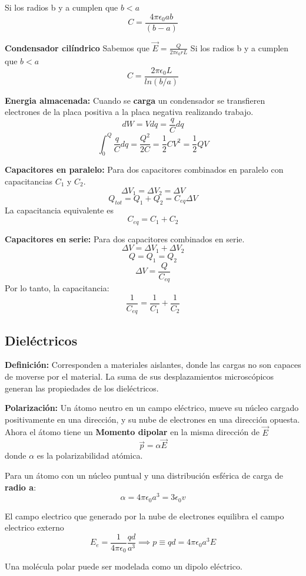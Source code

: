 \documentclass[a4paper, 10pt]{article}
\begin{document}
\begin{multicols*}{2}
	Si los radios b y a cumplen que $b<a$
	$$C = \frac{4 \pi \epsilon_0 ab}{(b-a)}$$
	    
	\textbf{Condensador cilíndrico}
	Sabemos que $\vec{E} = \frac{Q}{2 \pi \epsilon_0 r L}$
	Si los radios b y a cumplen que $b<a$
	$$C = \frac{2 \pi \epsilon_0 L}{ln(b/a)}$$
	    
	\textbf{Energia almacenada:}  Cuando se \textbf{carga} un condensador se transfieren electrones de la placa positiva a la placa negativa realizando trabajo.
	$$dW = Vdq = \frac{q}{C}dq $$
	$$\int_0^Q \frac{q}{C}dq = \frac{Q^2}{2C} = \frac{1}{2}CV^2 = \frac{1}{2}QV$$
	    
	\textbf{Capacitores en paralelo:} Para dos capacitores combinados en paralelo con capacitancias $C_1$ y $C_2$.
	$$\Delta V_1 = \Delta V_2 = \Delta V$$
	$$Q_{tot} = Q_1 + Q_2 =C_{eq} \Delta V$$
	La capacitancia equivalente es
	$$C_{eq}=C_1 + C_2$$
	    
	\textbf{Capacitores en serie:} Para dos capacitores combinados en serie.
	$$\Delta V =\Delta V_1 + \Delta V_2 $$
	$$Q = Q_1 = Q_2$$
	$$\Delta V = \frac{Q}{C_{eq}}$$
	Por lo tanto, la capacitancia:
	$$ \frac{1}{C_{eq}} = \frac{1}{C_1}+\frac{1}{C_2}$$
	    
	    
	\subsection*{Dieléctricos}
	\textbf{Definición:} Corresponden a materiales aislantes, donde las cargas no son capaces de moverse por el material. La suma de sus desplazamientos microscópicos generan las propiedades de los dieléctricos.
	    
	\textbf{Polarización:} Un átomo neutro en un campo eléctrico, mueve su núcleo cargado positivamente en una dirección, y su nube de electrones en una dirección opuesta. Ahora el átomo tiene un \textbf{Momento dipolar} en la misma dirección de $\vec{E}$ $$\vec{p}= \alpha \vec{E}$$
	donde $\alpha$ es la polarizabilidad atómica.
	    
	Para un átomo con un núcleo puntual y una distribución esférica de carga de \textbf{radio a}:
	$$\alpha = 4 \pi \epsilon_0 a^3 = 3 \epsilon_0 v$$
	     
	El campo electrico que generado por la nube de electrones equilibra el campo electrico externo $$E_e = \frac{1}{4 \pi \epsilon _0} \frac{qd}{a^3} \implies p \equiv qd = 4 \pi \epsilon_0a^3E$$
	    
	Una molécula polar puede ser modelada como un dipolo eléctrico.
	    

\end{multicols*}
\end{document}
